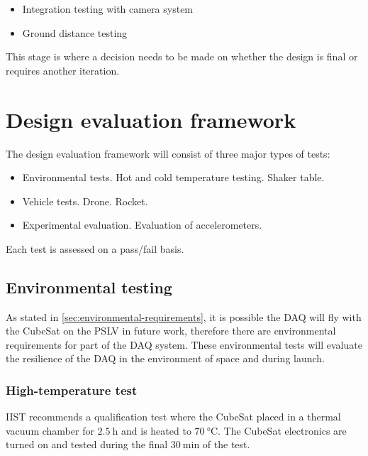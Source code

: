 \documentclass{report}
\begin{document}
\begin{itemize}
  \item Integration testing with camera system %
  \item Ground distance testing %
\end{itemize}

This stage is where a decision needs to be made on whether the design is final or requires another iteration.

\section{Design evaluation framework}

The design evaluation framework will consist of three major types of tests:

\begin{itemize}
  \item Environmental tests.
        \subitem Hot and cold temperature testing.
        \subitem Shaker table.
  \item Vehicle tests.
        \subitem Drone.
        \subitem Rocket.
  \item Experimental evaluation.
        \subitem Evaluation of accelerometers.
\end{itemize}

Each test is assessed on a pass/fail basis.

\subsection{Environmental testing}

As stated in \ref{sec:environmental-requirements}, it is possible the DAQ will fly with the CubeSat on the PSLV in future work, therefore there are environmental requirements for part of the DAQ system.
These environmental tests will evaluate the resilience of the DAQ in the environment of space and during launch.

\subsubsection{High-temperature test}
\label{sec:htemp-test-framework}
IIST recommends a qualification test where the CubeSat placed in a thermal vacuum chamber for $\SI{2.5}{\hour}$ and is heated to $\SI{70}{\degreeCelsius}$. The CubeSat electronics are turned on and tested during the final $\SI{30}{\minute}$ of the test.
\end{document}

